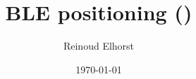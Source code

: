 \documentclass[a4paper, 12pt]{book}
\begin{document}
\title{BLE positioning ()}
\author{Reinoud Elhorst}
\date{\today}
\maketitle









\end{document}
